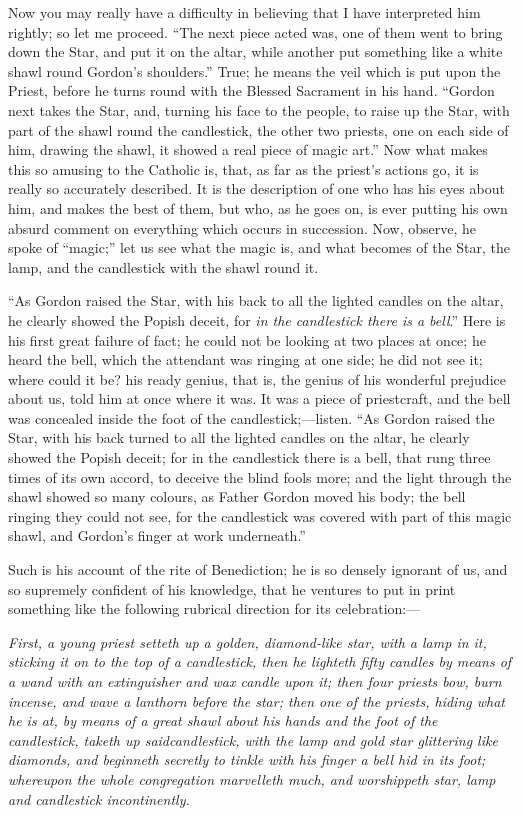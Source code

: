 Now you may really have a difficulty in believing that
I have interpreted him rightly; so let me proceed.
``The next piece acted was, one of them went to bring
down the Star, and put it on the altar, while another put
something like a white shawl round Gordon's
shoulders.'' True; he means the veil which is put
upon the Priest, before he turns round with the Blessed
Sacrament in his hand. ``Gordon next takes the Star,
and, turning his face to the people, to raise up the
Star, with part of the shawl round the candlestick, the
other two priests, one on each side of him, drawing the
shawl, it showed a real piece of magic art.'' Now
what makes this so amusing to the Catholic is, that, as
far as the priest's actions go, it is really so
accurately described. It is the description of one who
has his eyes about him, and makes the best of them, but
who, as he goes on, is ever putting his own absurd
comment on everything which occurs in succession. Now,
observe, he spoke of ``magic;'' let us see what
the magic is, and what becomes of the Star, the lamp, and
the candlestick with the shawl round it.

``As Gordon raised the Star, with his back to all the lighted candles on the altar, he clearly showed the
Popish deceit, for \emph{in the candlestick there is a bell}.''
Here is his first great failure of fact; he could not be
looking at two places at once; he heard the bell, which
the attendant was ringing at one side; he did not see it;
where could it be? his ready genius, that is, the genius
of his wonderful prejudice about us, told him at once
where it was. It was a piece of priestcraft, and the bell
was concealed inside the foot of the
candlestick;—listen. ``As Gordon raised the
Star, with his back turned to all the lighted candles on
the altar, he clearly showed the Popish deceit; for in
the candlestick there is a bell, that rung three times of
its own accord, to deceive the blind fools more; and the
light through the shawl showed so many colours, as Father
Gordon moved his body; the bell ringing they could not
see, for the candlestick was covered with part of this
magic shawl, and Gordon's finger at work
underneath.''

Such is his account of the rite of Benediction; he is
so densely ignorant of us, and so supremely confident of
his knowledge, that he ventures to put in print something
like the following rubrical direction for its
celebration:—

\emph{First, a young priest setteth up a golden,
diamond-like star, with a lamp in it, sticking it on to
the top of a candlestick, then he lighteth fifty candles
by means of a wand with an extinguisher and wax candle
upon it; then four priests bow, burn incense, and wave a
lanthorn before the star; then one of the priests, hiding
what he is at, by means of a great shawl about his hands
and the foot of the candlestick, taketh up said}\emph{candlestick, with the lamp and gold star glittering like
diamonds, and beginneth secretly to tinkle with his
finger a bell hid in its foot; whereupon the whole
congregation marvelleth much, and worshippeth star, lamp
and candlestick incontinently.}

